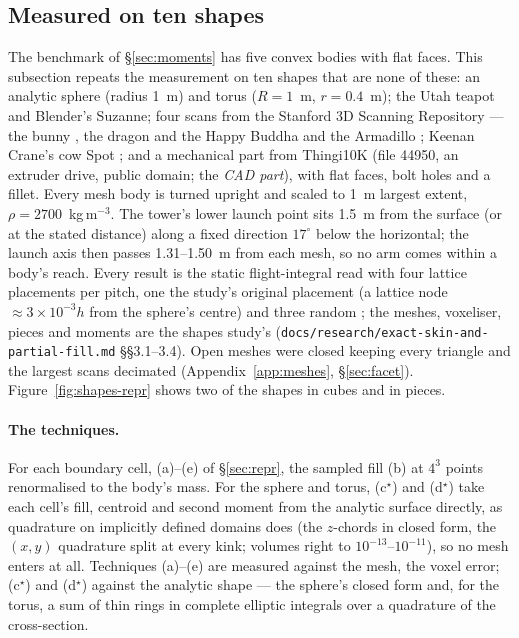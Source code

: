 \documentclass[10pt,a4paper]{article}
\begin{document}
\subsection{Measured on ten shapes}\label{sec:shapes}

The benchmark of \S\ref{sec:moments} has five convex bodies with flat faces. This subsection repeats the
measurement on ten shapes that are none of these: an analytic sphere (radius 1~m) and torus ($R=1$~m,
$r=0.4$~m); the Utah teapot and Blender's Suzanne; four scans from the Stanford 3D Scanning
Repository --- the bunny \citep{turk1994}, the dragon and the Happy Buddha \citep{curless1996} and the
Armadillo \citep{krishnamurthy1996}; Keenan Crane's cow Spot \citep{crane2013}; and a mechanical part
from Thingi10K \citep{zhou2016} (file 44950, an extruder drive, public domain; the \emph{CAD part}),
with flat faces, bolt holes and a fillet. Every mesh body is turned upright and scaled to 1~m largest
extent, $\rho = 2700$~kg\,m$^{-3}$. The tower's lower launch point sits 1.5~m from the surface (or at
the stated distance) along a fixed direction $17^\circ$ below the horizontal; the launch axis then
passes 1.31--1.50~m from each mesh, so no arm comes within a body's reach. Every result is the static
flight-integral read with four lattice placements per pitch, one the study's original placement
(a lattice node $\approx3\times10^{-3}h$ from the sphere's centre) and three random \citep[\S2]{paperrealread}; the meshes,
voxeliser, pieces and moments are the shapes study's
(\texttt{docs/research/exact-skin-and-partial-fill.md} \S\S3.1--3.4). Open meshes were closed keeping every triangle and the largest scans decimated
(Appendix~\ref{app:meshes}, \S\ref{sec:facet}). Figure~\ref{fig:shapes-repr} shows two of the shapes in cubes and in pieces.

\paragraph{The techniques.} For each boundary cell, (a)--(e) of \S\ref{sec:repr}, the sampled fill
(b) at $4^3$ points renormalised to the body's mass. For the sphere and torus, (c$^\star$) and (d$^\star$)
take each cell's fill, centroid and second moment from the analytic surface directly, as quadrature
on implicitly defined domains does \citep{muller2013,saye2015} (the $z$-chords
in closed form, the $(x,y)$ quadrature split at every kink; volumes right to
$10^{-13}$--$10^{-11}$), so no mesh enters at all. Techniques (a)--(e) are measured against the mesh,
the voxel error; (c$^\star$) and (d$^\star$) against the analytic shape --- the sphere's closed form
and, for the torus, a sum of thin rings in complete elliptic integrals over a quadrature of the
cross-section.
\end{document}

